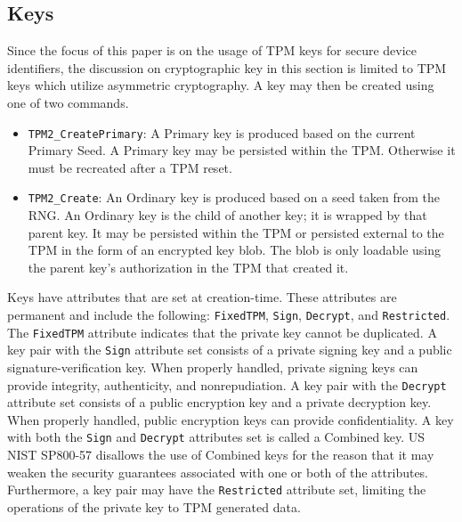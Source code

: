 \subsection{Keys}



Since the focus of this paper is on the usage of TPM keys for secure device identifiers, the discussion on cryptographic key in this section is limited to TPM keys which utilize asymmetric cryptography.  A key may then be created using one of two commands.
\begin{itemize}
  \item \verb|TPM2_CreatePrimary|: A Primary key is produced based on the current Primary Seed. A Primary key may be persisted within the TPM. Otherwise it must be recreated after a TPM reset.
  \item \verb|TPM2_Create|: An Ordinary key is produced based on a seed taken from the RNG. An Ordinary key is the child of another key; it is wrapped by that parent key. It may be persisted within the TPM or persisted external to the TPM in the form of an encrypted key blob. The blob is only loadable using the parent key's authorization in the TPM that created it.
\end{itemize}
Keys have attributes that are set at creation-time. These attributes are permanent and include the following: \verb|FixedTPM|, \verb|Sign|, \verb|Decrypt|, and \verb|Restricted|. The \verb|FixedTPM| attribute indicates that the private key cannot be duplicated. A key pair with the \verb|Sign| attribute set consists of a private signing key and a public signature-verification key. When properly handled, private signing keys can provide integrity, authenticity, and nonrepudiation. A key pair with the \verb|Decrypt| attribute set consists of a public encryption key and a private decryption key. When properly handled, public encryption keys can provide confidentiality. A key with both the \verb|Sign| and \verb|Decrypt| attributes set is called a Combined key. US NIST SP800-57 disallows the use of Combined keys for the reason that it may weaken the security guarantees associated with one or both of the attributes. Furthermore, a key pair may have the \verb|Restricted| attribute set, limiting the operations of the private key to TPM generated data.

